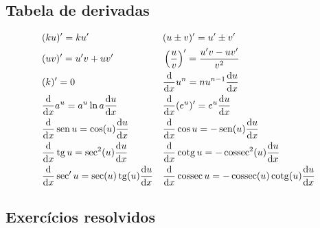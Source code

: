 \subsection{Tabela de derivadas}

\begin{align}
  & (ku)' = ku' && (u\pm v)' = u' \pm v'\\
  & (uv)' = u'v + uv' && \left(\frac{u}{v}\right)' = \frac{u'v - uv'}{v^2} \\
  & (k)' = 0 && \frac{\mathrm{d}}{\mathrm{d} x}u^n = nu^{n-1}\frac{\mathrm{d} u}{\mathrm{d} x}\\
  & \frac{\mathrm{d}}{\mathrm{d} x}a^u = a^u\ln a\frac{\mathrm{d} u}{\mathrm{d} x} && \frac{\mathrm{d}}{\mathrm{d} x}(e^u)' = e^u\frac{\mathrm{d} u}{\mathrm{d} x} \\
  & \frac{\mathrm{d}}{\mathrm{d} x}\operatorname{sen} u = \cos(u)\frac{\mathrm{d} u}{\mathrm{d} x} && \frac{\mathrm{d}}{\mathrm{d} x}\cos u = - \operatorname{sen}(u)\frac{\mathrm{d} u}{\mathrm{d} x}\\
  & \frac{\mathrm{d}}{\mathrm{d} x}\operatorname{tg} u = \sec^2(u)\frac{\mathrm{d} u}{\mathrm{d} x} && \frac{\mathrm{d}}{\mathrm{d} x}\operatorname{cotg} u = -\operatorname{cossec}^2(u)\frac{\mathrm{d} u}{\mathrm{d} x} \\
  & \frac{\mathrm{d}}{\mathrm{d} x}\sec' u = \sec(u)\operatorname{tg}(u)\frac{\mathrm{d} u}{\mathrm{d} x} && \frac{\mathrm{d}}{\mathrm{d} x}\operatorname{cossec} u = -\operatorname{cossec}(u)\operatorname{cotg}(u)\frac{\mathrm{d} u}{\mathrm{d} x}
\end{align}

\subsection*{Exercícios resolvidos}

